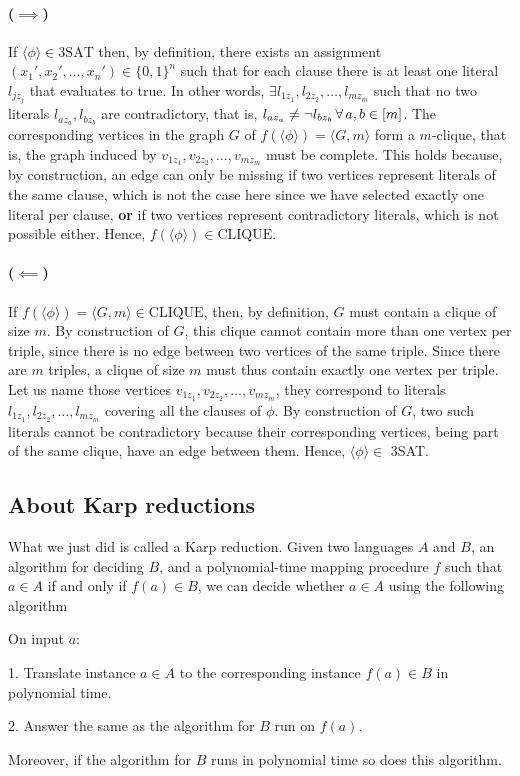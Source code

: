 \paragraph{(\(\implies\))} If \(\langle\phi\rangle \in \text{3SAT}\) then, by definition,
there exists an assignment \((x_1', x_2', \ldots, x_n') \in \{0,1\}^n\) such
that for each clause there is at least one literal \(l_{jz_j}\) that evaluates
to true. In other words, \(\exists l_{1z_1},l_{2z_2},\ldots,l_{mz_m}\) such
that no two literals \(l_{az_a},l_{bz_b}\) are contradictory, that is,
\(l_{az_a} \neq \lnot l_{bz_b} \operatorname{\forall} a,b \in [m]\). The corresponding
vertices in the graph \(G\) of \(f(\langle \phi \rangle) = \langle G,m
\rangle\)
form a \(m\)-clique, that
is, the graph induced by \(v_{1z_1},v_{2z_2},\ldots,v_{mz_m}\) must be
complete. This holds because, by construction, an edge can only be missing if two
vertices represent literals of the same clause, which is not the case here
since we have selected exactly one literal per clause, \textbf{or} if two
vertices represent contradictory literals, which is not
possible either. Hence, \(f(\langle \phi \rangle) \in \text{CLIQUE}\).

\paragraph{(\(\impliedby\))} If \(f(\langle \phi \rangle) = \langle G, m \rangle \in \text{CLIQUE}\),
then, by definition, \(G\) must contain a clique of size \(m\). By
construction of \(G\), this clique cannot contain more than one vertex per
triple, since there is no edge between two vertices of the same triple. Since
there are \(m\) triples, a clique of size \(m\) must thus contain exactly one
vertex per triple. Let us name those vertices
\(v_{1z_1},v_{2z_2},\ldots,v_{mz_m}\), they correspond to literals
\(l_{1z_1},l_{2z_2},\ldots,l_{mz_m}\) covering all the clauses of \(\phi\).
By construction of \(G\), two such literals cannot be contradictory because
their corresponding vertices, being part of the same clique, have an edge
between them. Hence, \(\langle \phi \rangle \in\) 3SAT.

\subsection{About Karp reductions}

What we just did is called a Karp reduction. Given two languages \(A\)
and \(B\), an algorithm for deciding \(B\), and a polynomial-time
mapping procedure \(f\) such that
\(a \in A\) if and only if \(f(a) \in B\), we can decide whether \(a \in A\) using
the following algorithm
\begin{TMachine}{On input \(a\):}
\item[1.] Translate instance \(a \in A\) to the corresponding instance \(f(a) \in
	B\) in polynomial time.
\item[2.] Answer the same as the algorithm for \(B\) run on \(f(a)\).
\end{TMachine}
Moreover, if the algorithm for \(B\) runs in polynomial time so does this
algorithm.

